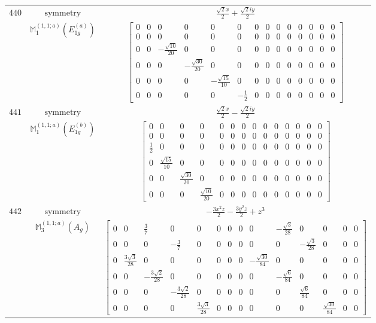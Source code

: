 \documentclass[fleqn,8pt,landscape]{jsarticle}
\begin{document}
\begin{longtable}{ccc}
$ 440 $ & $ \text{symmetry} $ & $ \frac{\sqrt{2} x}{2} + \frac{\sqrt{2} i y}{2} $ \\
$  $ & $ \mathbb{M}_{1}^{(1,1;a)}(E_{1g}^{(a)}) $ & $ \begin{bmatrix} 0 & 0 & 0 & 0 & 0 & 0 & 0 & 0 & 0 & 0 & 0 & 0 & 0 & 0 \\ 0 & 0 & 0 & 0 & 0 & 0 & 0 & 0 & 0 & 0 & 0 & 0 & 0 & 0 \\ 0 & 0 & - \frac{\sqrt{10}}{20} & 0 & 0 & 0 & 0 & 0 & 0 & 0 & 0 & 0 & 0 & 0 \\ 0 & 0 & 0 & - \frac{\sqrt{30}}{20} & 0 & 0 & 0 & 0 & 0 & 0 & 0 & 0 & 0 & 0 \\ 0 & 0 & 0 & 0 & - \frac{\sqrt{15}}{10} & 0 & 0 & 0 & 0 & 0 & 0 & 0 & 0 & 0 \\ 0 & 0 & 0 & 0 & 0 & - \frac{1}{2} & 0 & 0 & 0 & 0 & 0 & 0 & 0 & 0 \end{bmatrix} $ \\ \hline
$ 441 $ & $ \text{symmetry} $ & $ \frac{\sqrt{2} x}{2} - \frac{\sqrt{2} i y}{2} $ \\
$  $ & $ \mathbb{M}_{1}^{(1,1;a)}(E_{1g}^{(b)}) $ & $ \begin{bmatrix} 0 & 0 & 0 & 0 & 0 & 0 & 0 & 0 & 0 & 0 & 0 & 0 & 0 & 0 \\ 0 & 0 & 0 & 0 & 0 & 0 & 0 & 0 & 0 & 0 & 0 & 0 & 0 & 0 \\ \frac{1}{2} & 0 & 0 & 0 & 0 & 0 & 0 & 0 & 0 & 0 & 0 & 0 & 0 & 0 \\ 0 & \frac{\sqrt{15}}{10} & 0 & 0 & 0 & 0 & 0 & 0 & 0 & 0 & 0 & 0 & 0 & 0 \\ 0 & 0 & \frac{\sqrt{30}}{20} & 0 & 0 & 0 & 0 & 0 & 0 & 0 & 0 & 0 & 0 & 0 \\ 0 & 0 & 0 & \frac{\sqrt{10}}{20} & 0 & 0 & 0 & 0 & 0 & 0 & 0 & 0 & 0 & 0 \end{bmatrix} $ \\ \hline
$ 442 $ & $ \text{symmetry} $ & $ - \frac{3 x^{2} z}{2} - \frac{3 y^{2} z}{2} + z^{3} $ \\
$  $ & $ \mathbb{M}_{3}^{(1,1;a)}(A_{g}) $ & $ \begin{bmatrix} 0 & 0 & \frac{3}{7} & 0 & 0 & 0 & 0 & 0 & 0 & - \frac{\sqrt{3}}{28} & 0 & 0 & 0 & 0 \\ 0 & 0 & 0 & - \frac{3}{7} & 0 & 0 & 0 & 0 & 0 & 0 & - \frac{\sqrt{3}}{28} & 0 & 0 & 0 \\ 0 & \frac{3 \sqrt{3}}{28} & 0 & 0 & 0 & 0 & 0 & 0 & - \frac{\sqrt{30}}{84} & 0 & 0 & 0 & 0 & 0 \\ 0 & 0 & - \frac{3 \sqrt{2}}{28} & 0 & 0 & 0 & 0 & 0 & 0 & - \frac{\sqrt{6}}{84} & 0 & 0 & 0 & 0 \\ 0 & 0 & 0 & - \frac{3 \sqrt{2}}{28} & 0 & 0 & 0 & 0 & 0 & 0 & \frac{\sqrt{6}}{84} & 0 & 0 & 0 \\ 0 & 0 & 0 & 0 & \frac{3 \sqrt{3}}{28} & 0 & 0 & 0 & 0 & 0 & 0 & \frac{\sqrt{30}}{84} & 0 & 0 \end{bmatrix} $ \\ \hline

\end{longtable}
\end{document}
